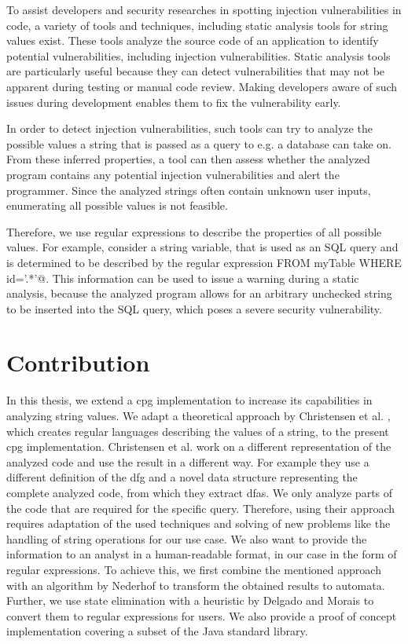 To assist developers and security researches in spotting injection vulnerabilities in code, a variety of tools and techniques, including static analysis tools for string values exist. These tools analyze the source code of an application to identify potential vulnerabilities, including injection vulnerabilities. Static analysis tools are particularly useful because they can detect vulnerabilities that may not be apparent during testing or manual code review. Making developers aware of such issues during development enables them to fix the vulnerability early.

In order to detect injection vulnerabilities, such tools can try to analyze the possible values a string that is passed as a query to e.g. a database can take on.
From these inferred properties, a tool can then assess whether the analyzed program contains any potential injection vulnerabilities and alert the programmer.
Since the analyzed strings often contain unknown user inputs, enumerating all possible values is not feasible. 

Therefore, we use regular expressions to describe the properties of all possible values.
For example, consider a string variable, that is used as an SQL query and is determined to be described by the regular expression \Verb@DELETE \* FROM myTable WHERE id='.*'@.
This information can be used to issue a warning during a static analysis, because the analyzed program allows for an arbitrary unchecked string to be inserted into the SQL query, which poses a severe security vulnerability.

\section{Contribution}\label{sec:intro:contribution}

In this thesis, we extend a \acf{cpg} implementation \cite{cpg} to increase its capabilities in analyzing string values. We adapt a theoretical approach by Christensen et al. \cite{brics}, which creates regular languages describing the values of a string, to the present \ac{cpg} implementation. Christensen et al. work on a different representation of the analyzed code and use the result in a different way. For example they use a different definition of the \ac{dfg} and a novel data structure representing the complete analyzed code, from which they extract \acp{dfa}. We only analyze parts of the code that are required for the specific query. Therefore, using their approach requires adaptation of the used techniques and solving of new problems like the handling of string operations for our use case. We also want to provide the information to an analyst in a human-readable format, in our case in the form of regular expressions.
To achieve this, we first combine the mentioned approach with an algorithm by Nederhof \cite{nederhof} to transform the obtained results to automata. Further, we use state elimination with a heuristic by Delgado and Morais \cite{delgado} to convert them to regular expressions for users. We also provide a proof of concept implementation covering a subset of the Java standard library.

